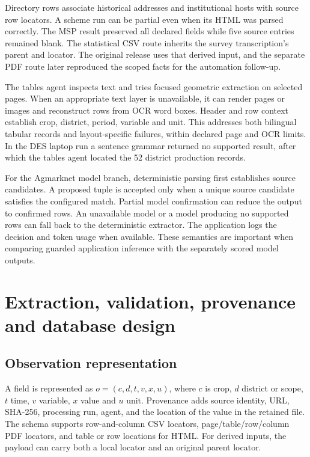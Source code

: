 \documentclass[11pt,a4paper]{article}
\begin{document}
Directory rows associate historical addresses and institutional hosts with source row locators. A scheme run can be partial even when its HTML was parsed correctly. The MSP result preserved all declared fields while five source entries remained blank. The statistical CSV route inherits the survey transcription's parent and locator. The original release uses that derived input, and the separate PDF route later reproduced the scoped facts for the automation follow-up.

The tables agent inspects text and tries focused geometric extraction on selected pages. When an appropriate text layer is unavailable, it can render pages or images and reconstruct rows from OCR word boxes. Header and row context establish crop, district, period, variable and unit. This addresses both bilingual tabular records and layout-specific failures, within declared page and OCR limits. In the DES laptop run a sentence grammar returned no supported result, after which the tables agent located the 52 district production records.

For the Agmarknet model branch, deterministic parsing first establishes source candidates. A proposed tuple is accepted only when a unique source candidate satisfies the configured match. Partial model confirmation can reduce the output to confirmed rows. An unavailable model or a model producing no supported rows can fall back to the deterministic extractor. The application logs the decision and token usage when available. These semantics are important when comparing guarded application inference with the separately scored model outputs.

\clearpage
\section{Extraction, validation, provenance and database design}
\subsection{Observation representation}
A field is represented as \(o=(c,d,t,v,x,u)\), where \(c\) is crop, \(d\) district or scope, \(t\) time, \(v\) variable, \(x\) value and \(u\) unit. Provenance adds source identity, URL, SHA-256, processing run, agent, and the location of the value in the retained file. The schema supports row-and-column CSV locators, page/table/row/column PDF locators, and table or row locations for HTML. For derived inputs, the payload can carry both a local locator and an original parent locator.
\end{document}
